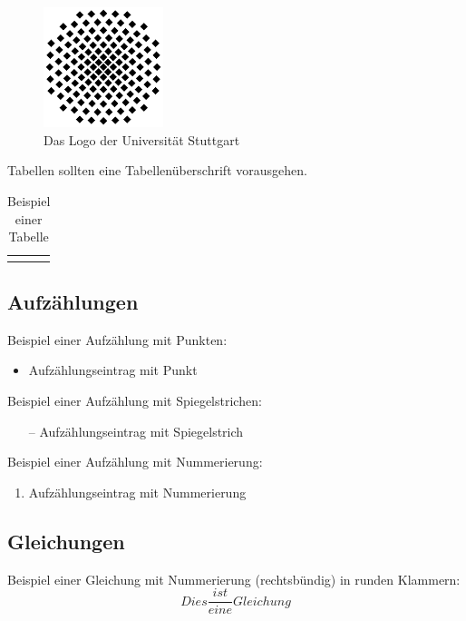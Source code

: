 \documentclass[12pt,paper=a4]{scrartcl}
\begin{document}
\begin{figure}[h]
	\centering
	\includegraphics[height=3.5cm]{graphics/uni-stuttgart-logo}
	\caption{Das Logo der Universität Stuttgart}
	\label{fig:uni-stuttgart-logo}
\end{figure}

Tabellen sollten eine Tabellenüberschrift vorausgehen.

\begin{table}[h]
	\centering
	\caption{Beispiel einer Tabelle}
	\begin{tabular}{|p{5cm}|p{5cm}|} \hline
		 & \\ \hline
		 & \\ \hline
	\end{tabular}
\end{table}

\subsection{Aufzählungen}
Beispiel einer Aufzählung mit Punkten:
\begin{itemize}
	\item Aufzählungseintrag mit Punkt
\end{itemize}
Beispiel einer Aufzählung mit Spiegelstrichen:
\begin{itemize}
	\item[--] Aufzählungseintrag mit Spiegelstrich
\end{itemize}
Beispiel einer Aufzählung mit Nummerierung:
\begin{enumerate}
	\item Aufzählungseintrag mit Nummerierung
\end{enumerate}


\subsection{Gleichungen}
Beispiel einer Gleichung mit Nummerierung (rechtsbündig) in runden Klammern:
\begin{equation}
	Dies \frac{ist}{eine}Gleichung
\end{equation}
\end{document}
